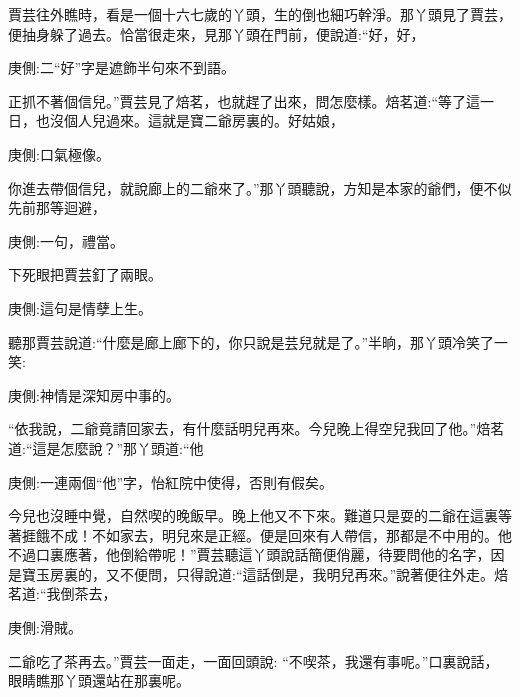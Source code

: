 \begin{parag}
    賈芸往外瞧時，看是一個十六七歲的丫頭，生的倒也細巧幹淨。那丫頭見了賈芸，便抽身躲了過去。恰當很走來，見那丫頭在門前，便說道:“好，好，\begin{note}庚側:二“好”字是遮飾半句來不到語。\end{note}正抓不著個信兒。”賈芸見了焙茗，也就趕了出來，問怎麼樣。焙茗道:“等了這一日，也沒個人兒過來。這就是寶二爺房裏的。好姑娘，\begin{note}庚側:口氣極像。\end{note}你進去帶個信兒，就說廊上的二爺來了。”那丫頭聽說，方知是本家的爺們，便不似先前那等迴避，\begin{note}庚側:一句，禮當。\end{note}下死眼把賈芸釘了兩眼。\begin{note}庚側:這句是情孽上生。\end{note}聽那賈芸說道:“什麼是廊上廊下的，你只說是芸兒就是了。”半晌，那丫頭冷笑了一笑:\begin{note}庚側:神情是深知房中事的。\end{note}“依我說，二爺竟請回家去，有什麼話明兒再來。今兒晚上得空兒我回了他。”焙茗道:“這是怎麼說？”那丫頭道:“他\begin{note}庚側:一連兩個“他”字，怡紅院中使得，否則有假矣。\end{note}今兒也沒睡中覺，自然喫的晚飯早。晚上他又不下來。難道只是耍的二爺在這裏等著捱餓不成！不如家去，明兒來是正經。便是回來有人帶信，那都是不中用的。他不過口裏應著，他倒給帶呢！”賈芸聽這丫頭說話簡便俏麗，待要問他的名字，因是寶玉房裏的，又不便問，只得說道:“這話倒是，我明兒再來。”說著便往外走。焙茗道:“我倒茶去，\begin{note}庚側:滑賊。\end{note}二爺吃了茶再去。”賈芸一面走，一面回頭說: “不喫茶，我還有事呢。”口裏說話，眼睛瞧那丫頭還站在那裏呢。
\end{parag}


